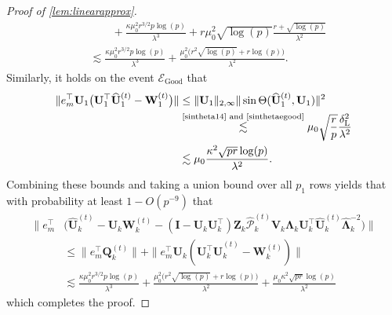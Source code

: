 \documentclass[10pt]{article}
\newcommand{\0}{{\mathbf{0}}}
\newcommand{\1}{{\mathbf{1}}}
\newcommand{\U}{{\mathbf{U}}}
\renewcommand{\t}{^{\top}}
\newcommand{\uhat}{\mathbf{\hat{U}}}
\newcommand{\dl}{\delta_{\mathrm{L}}}
\renewcommand{\hat}{\widehat}
\renewcommand{\hat}{\widehat}
\begin{document}
\begin{proof}[Proof of \cref{lem:linearapprox}]
\begin{align*}
    &\qquad +  \frac{\kappa \mu_0^2 r^{3/2} p \log(p)}{\lambda^3} + r \mu_0^2 \sqrt{\log(p)} \frac{r + \sqrt{\log(p)}}{\lambda^2}  \\
    &\lesssim \frac{\kappa \mu_0^2 r^{3/2} p \log(p)}{\lambda^3} + \frac{\mu_0^2 \big(r^2 \sqrt{\log(p)} + r \log(p) \big)}{\lambda^2}.
\end{align*} 
Similarly, it holds on the event $\mathcal{E}_{\mathrm{Good}}$ that
\begin{align*}
    \|e_m\t \U_1 \big( \U_1\t \uhat_1^{(t)} - \mathbf{W}_1^{(t)} \big) \| &\leq \| \U_1\|_{2,\infty} \|\sin\Theta(\uhat_1^{(t)},\U_1) \|^2 \\
    &\overset{\text{\cref{sintheta14} and \eqref{sinthetaegood}}}{\lesssim} \mu_0 \sqrt{\frac{r}{p}} \frac{\dl^2}{\lambda^2} \\
    &\lesssim \mu_0 \frac{ \kappa^2 \sqrt{pr} \log(p)}{\lambda^2}.
\end{align*}
Combining these bounds and taking a union bound over all $p_1$ rows yields that with probability at least $1 - O(p^{-9})$ that
\begin{align*}
    \|   e_m\t &\bigg(\uhat_k^{(t)} - \U_k \mathbf{W}_k^{(t)}  - (\mathbf{I} - \U_k \U_k\t) \mathbf{Z}_k \mathcal{\hat P}^{(t)}_k \mathbf{V}_k \mathbf{\Lambda}_k \U_k\t \uhat_k^{(t)} \mathbf{\hat{\Lambda}}_k^{-2} \bigg)\|  \\
    &\leq  \| e_m\t \mathbf{Q}_k^{(t)} \| + \|e_m\t \U_k (\U_k\t \uhat_k^{(t)} - \mathbf{W}_k^{(t)}) \| \\
    &\lesssim \frac{\kappa \mu_0^2 r^{3/2} p \log(p)}{\lambda^3} + \frac{\mu_0^2 \big(r^2 \sqrt{\log(p)} + r \log(p) \big)}{\lambda^2} + \frac{\mu_0 \kappa^2 \sqrt{pr}\log(p)}{\lambda^2}
\end{align*}
which completes the proof.
\end{proof}
\end{document}
